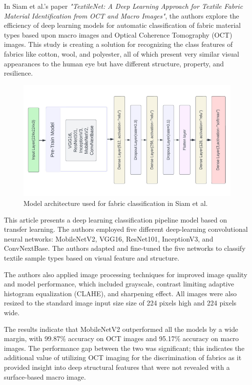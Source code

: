 In Siam et al.'s paper \textit{"TextileNet: A Deep Learning Approach for Textile Fabric Material Identification from OCT and Macro Images"}, the authors explore the efficiency of deep learning models for automatic classification of fabric material types based upon macro images and Optical Coherence Tomography (OCT) images. This study is creating a solution for recognizing the class features of fabrics like cotton, wool, and polyester, all of which present very similar visual appearances to the human eye but have different structure, property, and resilience.

\begin{figure}[H]
    \centering
    \begin{minipage}{1\linewidth}
        \includegraphics[width=\linewidth]{images/Paper2Model.png}
    \end{minipage}
    \caption[Model architecture - Siam et al.~\cite{siam2023textilenet}]{Model architecture used for fabric classification in Siam et al.~\cite{siam2023textilenet}}
\end{figure}

This article presents a deep learning classification pipeline model based on transfer learning. The authors employed five different deep-learning convolutional neural networks: MobileNetV2, VGG16, ResNet101, InceptionV3, and ConvNextBase. The authors adapted and fine-tuned the five networks to classify textile sample types based on visual feature and structure.

The authors also applied image processing techniques for improved image quality and model performance, which included grayscale, contrast limiting adaptive histogram equalization (CLAHE), and sharpening effect. All images were also resized to the standard image input size size of 224 pixels high and 224 pixels wide.

The results indicate that MobileNetV2 outperformed all the models by a wide margin, with 99.87\% accuracy on OCT images and 95.17\% accuracy on macro images. The performance gap between the two was significant; this indicates the additional value of utilizing OCT imaging for the discrimination of fabrics as it provided insight into deep structural features that were not revealed with a surface-based macro image.

